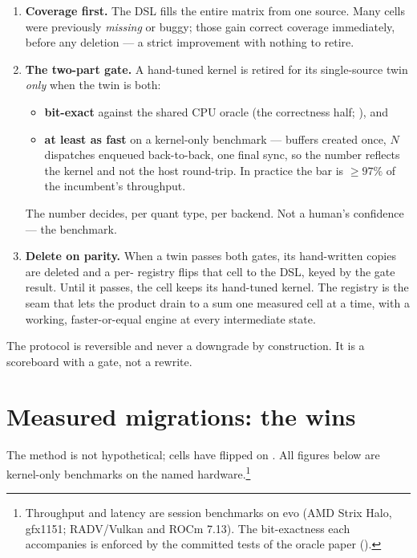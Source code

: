\documentclass[11pt]{article}
\begin{document}
\begin{enumerate}[leftmargin=1.6em,itemsep=2pt]
\item \textbf{Coverage first.} The DSL fills the entire matrix from one source. Many cells were previously
\emph{missing} or buggy; those gain correct coverage immediately, before any deletion --- a strict
improvement with nothing to retire.
\item \textbf{The two-part gate.} A hand-tuned kernel is retired for its single-source twin \emph{only}
when the twin is both:
  \begin{itemize}[leftmargin=1.4em,itemsep=0pt]
  \item \textbf{bit-exact} against the shared CPU oracle (the correctness half; \cite{oracle}), and
  \item \textbf{at least as fast} on a kernel-only benchmark --- buffers created once, $N$ dispatches
  enqueued back-to-back, one final sync, so the number reflects the kernel and not the host round-trip. In
  practice the bar is $\ge 97\%$ of the incumbent's throughput.
  \end{itemize}
  The number decides, per quant type, per backend. Not a human's confidence --- the benchmark.
\item \textbf{Delete on parity.} When a twin passes both gates, its hand-written copies are deleted and a
per- registry flips that cell to the DSL, keyed by the gate result. Until it
passes, the cell keeps its hand-tuned kernel. The registry is the seam that lets the product drain to a
sum one measured cell at a time, with a working, faster-or-equal engine at every intermediate state.
\end{enumerate}

The protocol is reversible and never a downgrade by construction. It is a scoreboard with a gate, not a
rewrite.

\section{Measured migrations: the wins}
\label{sec:wins}

The method is not hypothetical; cells have flipped on . All figures below are kernel-only
benchmarks on the named hardware.\footnote{Throughput and latency are session benchmarks on evo (AMD Strix
Halo, gfx1151; RADV/Vulkan and ROCm 7.13). The bit-exactness each accompanies is enforced by the committed
tests of the oracle paper (\cite{oracle}).}
\end{document}
